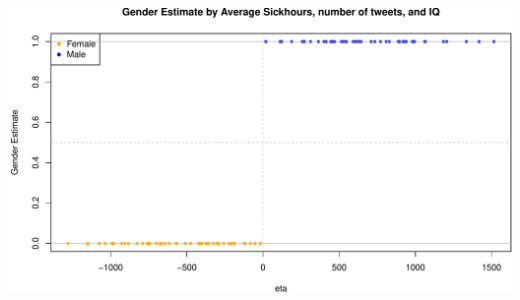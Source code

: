 \documentclass[
  ignorenonframetext,
]{beamer}
\begin{document}
\begin{frame}

\tiny\includegraphics{Schmitt_Marvin_binary_response_files/figure-beamer/unnamed-chunk-11-1.pdf}
\normalsize

\end{frame}
\end{document}
